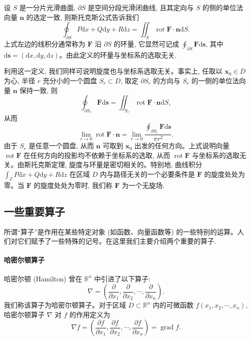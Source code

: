 设 $S$ 是一分片光滑曲面, $\partial S$ 是空间分段光滑闭曲线, 且其定向与 $S$ 的侧的单位法向量 $\boldsymbol n$ 的选定一致, 则斯托克斯公式告诉我们
\[
  \oint_{\partial S}P\mathrm dx+Q\mathrm dy+R\mathrm dz
  =
  \iint_S\operatorname{rot}\boldsymbol F\cdot\boldsymbol n\mathrm dS.
\]
上式左边的线积分通常称为 $\boldsymbol F$ 沿 $\partial S$ 的环量, 它显然可记成 $\oint_{\partial S}\boldsymbol F\mathrm d\boldsymbol s$, 其中 $\mathrm d\boldsymbol s=(\mathrm dx,\mathrm dy,\mathrm dz)$。由此定义的环量与坐标系的选取无关.

利用这一定义, 我们同样可说明旋度也与坐标系选取无关。事实上, 任取以 $\boldsymbol x_0\in D$ 为心, 半径 $r$ 充分小的一个圆盘 $S_r\subset D$, 取定 $\partial S_r$ 的方向与 $S_r$ 的一侧的单位法向量 $\boldsymbol n$ 保持一致, 则
\[
  \oint_{\partial S_r}\boldsymbol F\mathrm d\boldsymbol s
  =
  \iint_{S_r}\operatorname{rot}\boldsymbol F\cdot\boldsymbol n\mathrm dS,
\]
从而
\[
  \lim_{r\to0}\operatorname{rot}\boldsymbol F\cdot\boldsymbol n
  =
  \lim_{r\to0}
  \frac{\displaystyle\oint_{\partial S_r}\boldsymbol F\mathrm d\boldsymbol s}{\pi r^2}.
\]
由于 $S_r$ 是任意一个圆盘, 从而 $\boldsymbol n$ 可取到 $\boldsymbol x_0$ 出发的任何方向。上式说明向量 $\operatorname{rot}\boldsymbol F$ 在任何方向的投影均不依赖于坐标系的选取, 从而 $\operatorname{rot}\boldsymbol F$ 与坐标系的选取无关。由斯托克斯定理, 旋度与环量是密切相关的。特别地, 曲线积分 $\int_\Gamma P\mathrm dx+Q\mathrm dy+R\mathrm dz$ 在区域 $D$ 内与路径无关的一个必要条件是 $\boldsymbol F$ 的旋度处处为零。当 $\boldsymbol F$ 的旋度处处为零时, 我们称 $\boldsymbol F$ 为一个无旋场.

\subsection{一些重要算子}
\label{subsec:ma-16-8-5}

所谓“算子”是作用在某些特定对象 (如函数、向量函数等) 的一些特别的运算。人们对它们赋予了一些特殊的记号。在这里我们主要介绍两个重要的算子.

\paragraph*{哈密尔顿算子}


哈密尔顿 (Hamilton) 曾在 $\mathbb R^n$ 中引进了以下算子:
\[
  \nabla=\left(\frac{\partial}{\partial x_1},\frac{\partial}{\partial x_2},\cdots,\frac{\partial}{\partial x_n}\right).
\]
我们称该算子为哈密尔顿算子。对于区域 $D\subset\mathbb R^n$ 内的可微函数 $f(x_1,x_2,\cdots,x_n)$, 哈密尔顿算子 $\nabla$ 对 $f$ 的作用定义为
\[
  \nabla f=\left(\frac{\partial f}{\partial x_1},\frac{\partial f}{\partial x_2},\cdots,\frac{\partial f}{\partial x_n}\right)=\operatorname{grad}f.
\]

